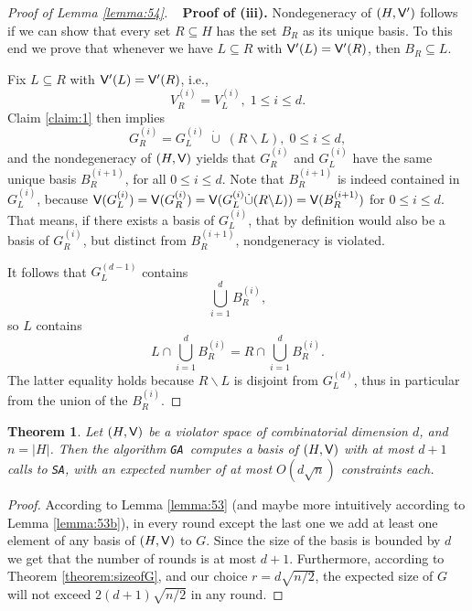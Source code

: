 \documentclass[12pt]{article}
\def\Violators{{\sf V}}
\newtheorem{theorem2}{Theorem}[section]
\newenvironment{theorem}{\begin{theorem2}}{\end{theorem2}}
\theoremstyle{remark}
\def\stageI{\texttt{GA}}
\def\stageII{\texttt{SA}}
\begin{document}
\begin{proof}[Proof of Lemma \ref{lemma:54}]
    ~\newline
     \textbf{Proof of (iii).}
     Nondegeneracy of $(H,\Violators')$ follows if we can show that every set $R\subseteq H$
     has the set $B_{R}$ as its unique basis. To this end we prove that whenever we have
     $L\subseteq R$ with $\Violators'(L) = \Violators'(R)$, then $B_{R}\subseteq L$.
     
     Fix $L\subseteq R$ with $\Violators'(L) = \Violators'(R)$, i.e.,
     \[
     	 V_{R}^{(i)} = V_{L}^{(i)}, \; 1\leq i\leq d.
     \]
     Claim \ref{claim:1} then implies
     \[
     	G_{R}^{(i)} = G_{L}^{(i)} \;\dot{\cup}\; (R\backslash L), \; 0\leq i \leq d,
     \]
     and the nondegeneracy of $(H, \Violators)$ yields that $G_{R}^{(i)}$ and
     $G_{L}^{(i)}$ have the same unique basis $B_{R}^{(i+1)}$, for all $0\leq i \leq d$.
     Note that $B_{R}^{(i+1)}$ is indeed contained in $G_{L}^{(i)}$, because 
     $\Violators(G_L^{(i)})=\Violators(G_R^{(i)})=\Violators(G_L^{(i)}\dot{\cup}(R\backslash L))=
     \Violators(B_{R}^{(i+1)})$ for $0\leq i \leq d$. That means, if there exists a basis of $G_L^{(i)}$,
     that by definition would also be a basis
     of $G_R^{(i)}$, but distinct from $B_{R}^{(i+1)}$, nondgeneracy is violated.
     
     It follows that $G_{L}^{(d-1)}$ contains
     \[
     	\bigcup_{i=1}^{d} B_{R}^{(i)},
     \]
     so $L$ contains
     \[
     	L\cap \bigcup_{i=1}^{d} B_{R}^{(i)} = R\cap \bigcup_{i=1}^{d} B_{R}^{(i)}.
     \]
     The latter equality holds because $R\backslash L$ is disjoint from $G_{L}^{(d)}$,
     thus in particular from the union of the $B_{R}^{(i)}$.
     \end{proof}
    
    \begin{theorem}
    \label{theorem:runningtime1}
    Let  $(H,\Violators)$ be a violator space of combinatorial dimension $d$, and  $n= |H| $.
Then the algorithm \stageI~computes a basis of $(H,\Violators)$ with
 at most $d+1$ calls to \stageII, with an expected number of 
at most $O(d\sqrt{n})$
constraints each.
    \end{theorem}
    \begin{proof}
    According to Lemma \ref{lemma:53} (and maybe more intuitively according to Lemma \ref{lemma:53b}),
    in every round except the last one we add at least one element of any basis of $(H,\Violators)$ to $G$.
    Since the size of the basis is bounded by $d$ we get that the number of rounds is at most $d+1$. Furthermore,
    according to Theorem \ref{theorem:sizeofG}, and our choice $r=d\sqrt{n/2}$, the expected size of $G$ will not
    exceed $2(d+1)\sqrt{{n}/{2}}$ in any round.
    \end{proof}
\end{document}
